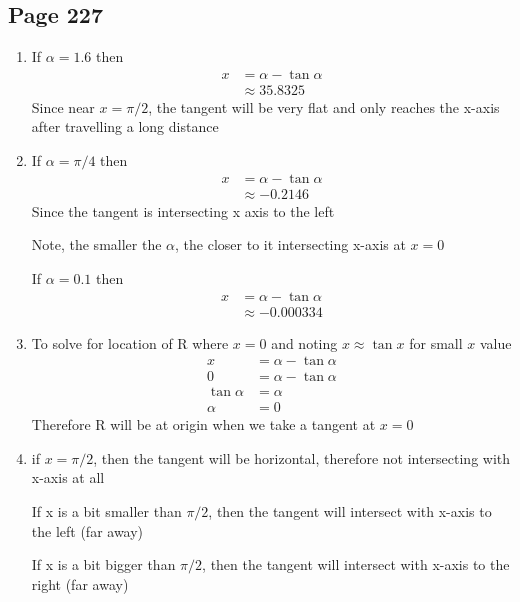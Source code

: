 \documentclass{article}
\newenvironment{solutions}[1]
{\subsection*{#1}
 \begin{enumerate}[leftmargin=1.5em]}
{\end{enumerate}}
\newcommand{\solution}{\item}
\begin{document}
\begin{solutions}{Page 227}
\solution
If $\alpha = 1.6$ then
\begin{align*}
    x &= \alpha - \tan \alpha\\
      &\approx 35.8325
\end{align*}
Since near $x=\pi/2$, the tangent will be very flat and only reaches the x-axis after travelling a long distance

\solution
If $\alpha = \pi/4$ then
\begin{align*}
    x &= \alpha - \tan \alpha\\
      &\approx -0.2146
\end{align*}
Since the tangent is intersecting x axis to the left

Note, the smaller the $\alpha$, the closer to it intersecting x-axis at $x=0$

If $\alpha = 0.1$ then
\begin{align*}
    x &= \alpha - \tan \alpha\\
      &\approx -0.000334
\end{align*}
\solution
To solve for location of R where $x=0$ and noting $x \approx \tan x$ for small $x$ value
\begin{align*}
    x &= \alpha -\tan \alpha\\
    0 &= \alpha -\tan \alpha\\
    \tan \alpha &= \alpha \\
    \alpha &= 0
\end{align*}
Therefore R will be at origin when we take a tangent at $x=0$
\solution
if $x=\pi/2$, then the tangent will be horizontal, therefore not intersecting with x-axis at all

If x is a bit smaller than $\pi/2$, then the tangent will intersect with x-axis to the left (far away)

If x is a bit bigger than $\pi/2$, then the tangent will intersect with x-axis to the right (far away)
\end{solutions}
\end{document}

